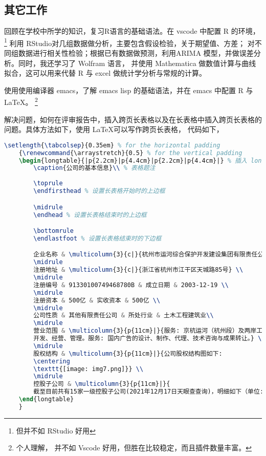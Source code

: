 \documentclass[UTF8,AutoFakeBold]{ctexart}
\begin{document}
\subsection{其它工作}
回顾在学校中所学的知识，复习R语言的基础语法。在 vscode 中配置 R 的环境，\footnote{\fangsong 但并不如 RStudio 好用}
利用 RStudio对几组数据做分析，主要包含假设检验，关于期望值、方差；
对不同组数据进行相关性检验；根据已有数据做预测，利用ARIMA 模型，并做误差分析。同时，我还学习了 Wolfram 语言，
并使用 Mathematica 做数值计算与曲线拟合，这可以用来代替 R 与 excel 做统计学分析与常规的计算。\par 
使用使用编译器 emacs，了解 emacs lisp 的基础语法，并在 emacs 中配置 R 与 \LaTeX。 \footnote{\fangsong 个人理解，
并不如 Vscode 好用，但胜在比较稳定，而且插件数量丰富。}\par 
解决问题，如何在评审报告中，插入跨页长表格以及在长表格中插入跨页长表格的问题。具体方法如下，使用 \LaTeX 可以写作跨页长表格，
代码如下，
\begin{lstlisting}[style=mystyle,language=TeX]
    \setlength{\tabcolsep}{0.35em} % for the horizontal padding
    {\renewcommand{\arraystretch}{0.5} % for the vertical padding 
    \begin{longtable}{|p{2.2cm}|p{4.4cm}|p{2.2cm}|p{4.4cm}|} % 插入 longtable, 设置列数
        \caption{公司的基本信息}\\ % 表格题注
        
        \toprule
        \endfirsthead % 设置长表格开始时的上边框

        \midrule
        \endhead % 设置长表格结束时的上边框

        \bottomrule 
        \endlastfoot % 设置长表格结束时的下边框

        企业名称 & \multicolumn{3}{c|}{杭州市运河综合保护开发建设集团有限责任公司} \\
        \midrule
        注册地址 & \multicolumn{3}{c|}{浙江省杭州市江干区天城路85号} \\
        \midrule 
        注册编号 & 91330100749468780B & 成立日期 & 2003-12-19 \\
        \midrule 
        注册资本 & 500亿 & 实收资本 & 500亿 \\
        \midrule 
        公司性质 & 其他有限责任公司 & 所处行业 & 土木工程建筑业\\
        \midrule 
        营业范围 & \multicolumn{3}{p{11cm}|}{服务: 京杭运河（杭州段）及两岸工程建设、
        开发、经营、管理。服务: 国内广告的设计、制作、代理、技术咨询与成果转让。} \\
        \midrule 
        股权结构 & \multicolumn{3}{p{11cm}|}{公司股权结构图如下:  
        \centering
        \texttt{[image: img7.png]}} \\
        \midrule 
        控股子公司 & \multicolumn{3}{p{11cm}|}{
        截至目前共有15家一级控股子公司(2021年12月17日天眼查查询)，明细如下（单位: 万元）:
    \end{longtable}
    }
\end{lstlisting}
\end{document}
